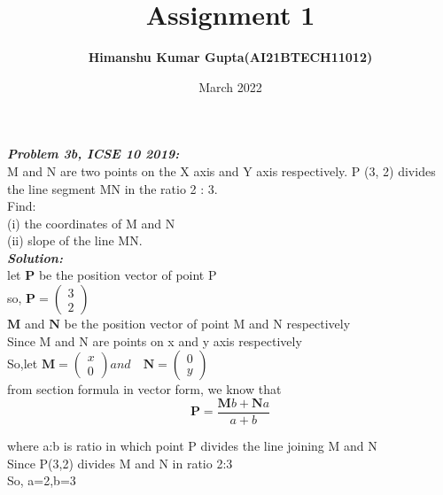 \documentclass[journal,12pt,threecolumn]{IEEEtran}
\begin{document}
\newcommand{\myvec}[1]{\ensuremath{\begin{pmatrix}#1\end{pmatrix}}}

\let\vec\mathbf

\title{Assignment 1}
\author{\textbf{Himanshu Kumar Gupta(AI21BTECH11012)}}
\maketitle
\date {March 2022}


\textbf{\textit{Problem 3b, ICSE 10 2019:}}\\

 M and N are two points on the X axis and Y axis respectively. 
P (3, 2) divides the line segment MN in the ratio 2 : 3.\\
Find:\\
(i)   the coordinates of M and N\\
(ii)  slope of the line MN.\\

\textbf{\textit{Solution:}}\\
 let $\vec{P}$ be the position vector of point P\\
  so, $\vec{P}=\myvec{3 \\ 2}$\\
 $\vec{M}$ and $\vec{N}$ be the position vector of point M and N respectively\\
Since M and N are points on x and y axis respectively\\
  So,let $\vec{M}=\myvec{x\\0} and\quad \vec{N}=\myvec{0\\y}$\\
  
  from section formula in vector form, we know that\\
  \begin{equation}
\vec{P}=\frac{\vec{M}b+\vec{N}a}{a+b}     \nonumber
  \end{equation}
 
  where a:b is ratio in which point P divides the line joining M and N\\
Since P(3,2) divides M and N in ratio 2:3\\
So, a=2,b=3\\
\end{document}
